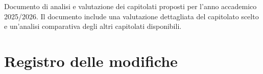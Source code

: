 \documentclass[a4paper,11pt]{article}
\begin{document}
\vspace{0.5cm}

\begin{center}
\begin{tcolorbox}[colback=secondaryblue!10,colframe=secondaryblue,width=0.9\textwidth,arc=3mm,boxrule=0.8pt,title={\bfseries Abstract}]
Documento di analisi e valutazione dei capitolati proposti per l'anno accademico 2025/2026. Il documento include una valutazione dettagliata del capitolato scelto e un'analisi comparativa degli altri capitolati disponibili.
\end{tcolorbox}
\end{center}

\newpage
\section*{Registro delle modifiche}

\setlength{\extrarowheight}{2pt} %
\renewcommand{\arraystretch}{1.5} 
\end{document}

